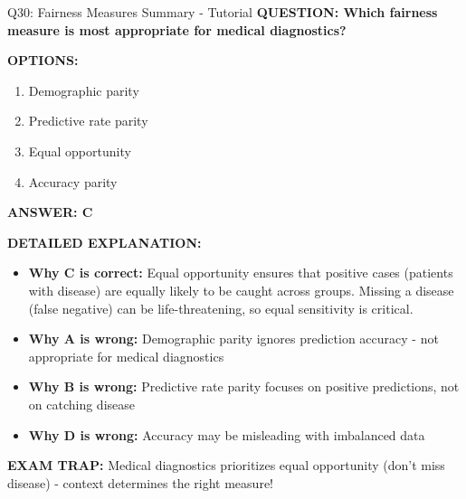 \documentclass[8pt]{beamer}
\begin{document}
	\begin{frame}{Q30: Fairness Measures Summary - Tutorial}
		\fontsize{6.5}{7.5}\selectfont
		\textbf{QUESTION: Which fairness measure is most appropriate for medical diagnostics?}
		
		\vspace{0.1cm}
		\textbf{OPTIONS:}
		\begin{enumerate}
			\item Demographic parity
			\item Predictive rate parity
			\item Equal opportunity
			\item Accuracy parity
		\end{enumerate}
		
		\vspace{0.1cm}
		\textcolor{myblue}{\textbf{ANSWER: C}}
		
		\vspace{0.1cm}
		\textbf{DETAILED EXPLANATION:}
		\begin{itemize}
			\item \textbf{Why C is correct:} Equal opportunity ensures that positive cases (patients with disease) are equally likely to be caught across groups. Missing a disease (false negative) can be life-threatening, so equal sensitivity is critical.
			\item \textbf{Why A is wrong:} Demographic parity ignores prediction accuracy - not appropriate for medical diagnostics
			\item \textbf{Why B is wrong:} Predictive rate parity focuses on positive predictions, not on catching disease
			\item \textbf{Why D is wrong:} Accuracy may be misleading with imbalanced data
		\end{itemize}
		
		\textcolor{myred}{\textbf{EXAM TRAP:}} Medical diagnostics prioritizes \textcolor{myblue}{equal opportunity} (don't miss disease) - context determines the right measure!
	\end{frame}
	
	
\end{document}
